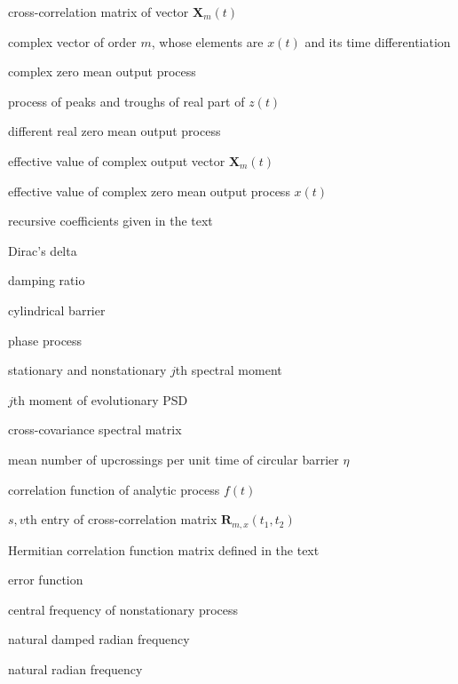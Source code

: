 \documentclass[12pt]{article}
\begin{document}
\begin{description}[align=left, labelwidth=2cm]
    \item[$\mathbf{R}_{m,x}(t_1, t_2)$] cross-correlation matrix of vector $\mathbf{X}_m(t)$
    \item[$\mathbf{X}_m(t)$] complex vector of order $m$, whose elements are $x(t)$ and its time differentiation
    \item[$x(t)$] complex zero mean output process
    \item[$Y(t_n)$] process of peaks and troughs of real part of $z(t)$
    \item[$y(t), \tilde{y}(t)$] different real zero mean output process
    \item[$\mathbf{Z}_m(t)$] effective value of complex output vector $\mathbf{X}_m(t)$
    \item[$z(t)$] effective value of complex zero mean output process $x(t)$
    \item[$a_r, b_r$] recursive coefficients given in the text
    \item[$\delta(\tau)$] Dirac's delta
    \item[$\zeta$] damping ratio
    \item[$\eta$] cylindrical barrier
    \item[$\theta(t)$] phase process
    \item[$\mu_j^*(t)$] stationary and nonstationary $j$th spectral moment
    \item[$\mu_{j,x}(t)$] $j$th moment of evolutionary PSD
    \item[$\mathbf{A}_{m,x}(t)$] cross-covariance spectral matrix
    \item[$\nu_+(\eta, t)$] mean number of upcrossings per unit time of circular barrier $\eta$
    \item[$P_f(\tau)$] correlation function of analytic process $f(t)$
    \item[$P_{s,v,x}(t_1, t_2)$] $s,v$th entry of cross-correlation matrix $\mathbf{R}_{m,x}(t_1, t_2)$
    \item[$\mathbf{K}_{m,z}(t_1, t_2)$] Hermitian correlation function matrix defined in the text
    \item[$\Phi(\cdot)$] error function
    \item[$\omega_a(t)$] central frequency of nonstationary process
    \item[$\omega_d$] natural damped radian frequency
    \item[$\omega_0$] natural radian frequency
\end{description}
\end{document}
